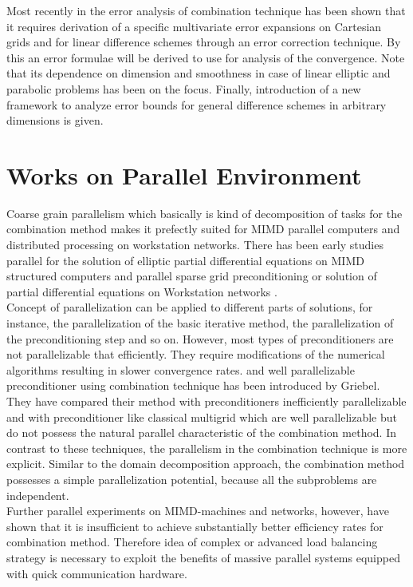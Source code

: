 Most recently in the error analysis of combination technique has been shown that it requires derivation of a specific multivariate error expansions on Cartesian grids and for linear difference schemes through an error correction technique. By this an error formulae will be derived to use for analysis of the convergence. Note that its dependence on dimension and smoothness in case of linear elliptic and parabolic problems has been on the focus. Finally, introduction of a new framework to analyze error bounds for general difference schemes in arbitrary dimensions is given. \cite{Reisinger2013}\\ 
\section{Works on Parallel Environment}
Coarse grain parallelism which basically is kind of decomposition of tasks for the combination method makes it prefectly suited for MIMD parallel computers and distributed processing on workstation networks. There has been early studies parallel for the solution of elliptic partial differential equations on MIMD structured computers and parallel sparse grid preconditioning or solution of partial differential equations on Workstation networks \cite{Griebel1992, Griebel1992a}.\\
Concept of parallelization can be applied to different parts of solutions, for instance, the parallelization of the basic iterative method, the parallelization of the preconditioning step and so on. However, most types of preconditioners are not parallelizable that efficiently. They require modifications of the numerical algorithms resulting in slower convergence rates. and well parallelizable preconditioner using combination technique has been introduced by Griebel. They have compared their method with preconditioners inefficiently parallelizable and with preconditioner like classical multigrid which are well parallelizable but do not possess the natural parallel characteristic of the combination method. In contrast to these techniques, the parallelism in the combination technique is more explicit. Similar to the domain decomposition approach, the combination method possesses a simple parallelization potential, because all the subproblems are independent\cite{Griebel1992}.\\
Further parallel experiments on MIMD-machines and networks, however, have shown that it is insufficient to achieve substantially better efficiency rates for combination method. Therefore idea of complex or advanced load balancing strategy is necessary to exploit the benefits of massive parallel systems equipped with quick communication hardware.\cite{Griebel1992} \\
